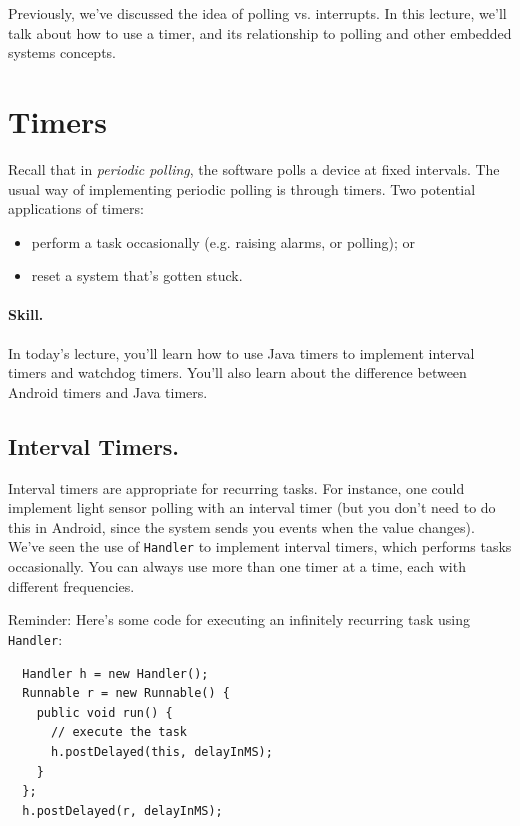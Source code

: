 




Previously, we've discussed the idea of polling vs. interrupts. In this lecture, we'll talk about how to use a timer, and its relationship to polling and other embedded
systems concepts.

\section*{Timers}
Recall that in \emph{periodic polling}, the software polls a device at
fixed intervals. The usual way of implementing periodic polling is
through timers. Two potential applications of timers:
\begin{itemize}
\item perform a task occasionally (e.g. raising alarms, or polling); or
\item reset a system that's gotten stuck.
\end{itemize}




\paragraph{Skill.} In today's lecture, you'll learn how to use Java timers to
implement interval timers and watchdog timers. You'll also learn about
the difference between Android timers and Java timers.

\subsection*{Interval Timers.} Interval timers are appropriate for recurring tasks. 
For instance, one could implement light sensor polling with an
interval timer (but you don't need to do this in Android, since the
system sends you events when the value changes). We've seen the use of
{\tt Handler} to implement interval timers, which performs tasks
occasionally.  You can always use more than one timer at a time, each
with different frequencies.

Reminder: Here's some code for executing an infinitely recurring task using
{\tt Handler}:

{\small \begin{lstlisting}
  Handler h = new Handler();
  Runnable r = new Runnable() {
    public void run() {
      // execute the task
      h.postDelayed(this, delayInMS);
    }
  };
  h.postDelayed(r, delayInMS);
\end{lstlisting}}

